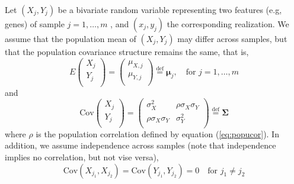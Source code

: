 \documentclass[review]{elsarticle}
\newcommand{\cov}{\text{Cov}}
\begin{document}
	Let $(X_j, Y_j)$ be a bivariate random variable representing two features (e.g, genes) of 
	sample $j = 1, \ldots, m$ , and $(x_j, y_j)$ the corresponding realization.
	We assume that the population mean of $(X_j, Y_j)$ may differ across samples, but that the 
	population covariance structure remains the 
	same, that is,  
	\begin{equation}\label{eq:meanstruct}
	E  \left(\begin{array}{c}
	X_j\\
	Y_j\\	
	\end{array} \right) 
	= 	\left(\begin{array}{c}
	\mu_{X,j}\\
	\mu_{Y,j}\\
	\end{array} \right)\stackrel{\text{def}}{=} \bm \mu_j,  \text{~~ for $j = 1, \ldots, m$}
	\end{equation}
	and 
	\begin{equation}\label{eq:covstruct}
	\cov\left(\begin{array}{c}
	X_j\\
	Y_j\\	
	\end{array} \right)	
	= \left(
	\begin{array}{cc}
	\sigma_X^2 &\rho \sigma_X\sigma_Y \\
	\rho \sigma_X \sigma_Y & 	\sigma_Y^2 \\
	\end{array} 
	\right)
	\stackrel{\text{def}}{=} \bm \Sigma 
	\end{equation}
	where $\rho$ is the population correlation defined by equation (\ref{eq:popucor}). In addition, 
	we assume independence across samples (note that independence implies no correlation, but not 
	vise versa), 
	\begin{equation}\label{eq:indepsamples}
	\cov(X_{j_1}, X_{j_2}) = \cov(Y_{j_1}, Y_{j_2}) = 0 \text{~~~for $j_1\neq j_2$}
	\end{equation}
	
	
	
	
	
\end{document}
